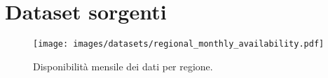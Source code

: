 \section{Dataset sorgenti}\label{sec:datasets}
\begin{figure}
  \centering
  \texttt{[image: images/datasets/regional\_monthly\_availability.pdf]}
  \caption{Disponibilità mensile dei dati per regione.}\label{fig:regional-monthly}
\end{figure}
